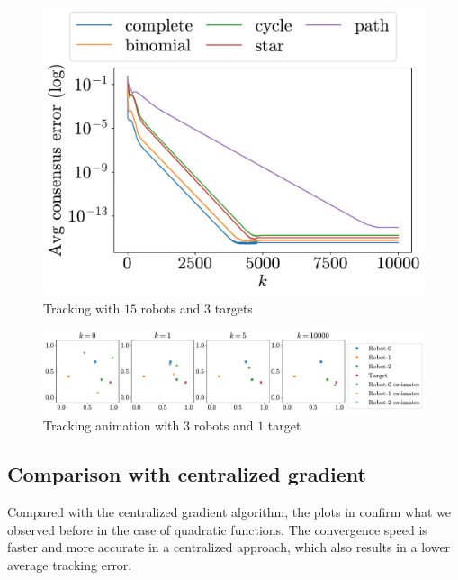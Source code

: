 \documentclass[a4paper,11pt,oneside]{book}
\begin{document}
\begin{figure}[H]
      \centering
      \includegraphics[width=0.46\linewidth]{./figs/tracking/15_3_2/consensus.pdf} 
      \caption{Tracking with $15$ robots and $3$ targets}
      \label{fig:tracking_consensus}
\end{figure}

\begin{figure}[H]
      \centering
      \includegraphics[width=\linewidth]{./figs/tracking/anim.pdf} 
      \caption{Tracking animation with $3$ robots and $1$ target}
      \label{fig:tracking_animation}
\end{figure}


\subsection{Comparison with centralized gradient}

Compared with the centralized gradient algorithm, the plots in  confirm what we observed before in the case of quadratic functions. The convergence speed is faster and more accurate in a centralized approach, which also results in a lower average tracking error.
\end{document}
